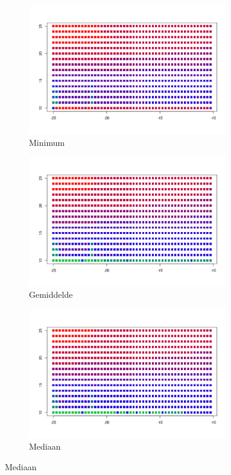\documentclass{article}
\begin{document}
\begin{figure}[!htb]
 \caption{FPS t.o.v. beide parameters; $\log_2(fps)$, $x=\log_{10}(prec)$, $y=\log_{2}(it)$}
 \begin{subfigure}{0.49\textwidth}
  \caption{Minimum}
  \includegraphics[width=0.95\textwidth]{elegant-gl/datasets/colors_min}
 \end{subfigure}
 \begin{subfigure}{0.49\textwidth}
  \caption{Gemiddelde}
  \includegraphics[width=0.95\textwidth]{elegant-gl/datasets/colors_mean}
 \end{subfigure}
 \begin{subfigure}{0.49\textwidth}
  \caption{Mediaan}
  \includegraphics[width=0.95\textwidth]{elegant-gl/datasets/colors_median}

\end{subfigure}
\end{figure}
\end{document}
